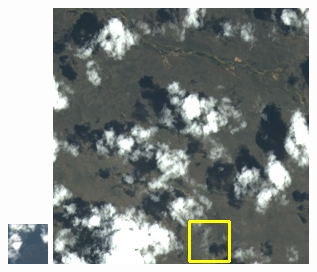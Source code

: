 \documentclass[10pt]{ctexart}
\begin{document}
\begin{figure}[H]
{{\begin{minipage}[b]{0.15\linewidth}
            \includegraphics[width=1\linewidth]{../log/spoon2/cut/tmp_cut_LC80350192014190LGN00_06561_color.jpg}\vspace{4pt}
            \includegraphics[width=1\linewidth]{../log/spoon2/cut/LC80980712014024LGN00_15443_color.jpg}\vspace{4pt}

\end{minipage}}}
\end{figure}
\end{document}
